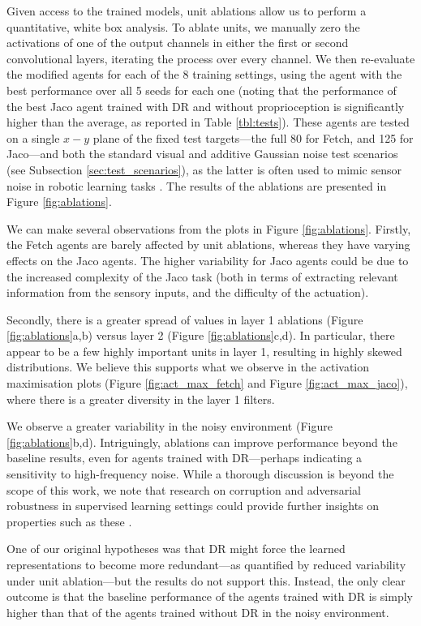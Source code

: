 Given access to the trained models, unit ablations allow us to perform a
quantitative, white box analysis. To ablate units, we manually zero the
activations of one of the output channels in either the first or second
convolutional layers, iterating the process over every channel. We then
re-evaluate the modified agents for each of the 8 training settings,
using the agent with the best performance over all 5 seeds for each one
(noting that the performance of the best Jaco agent trained with DR and
without proprioception is significantly higher than the average, as
reported in Table \ref{tbl:tests}). These agents are tested on a single
\(x-y\) plane of the fixed test targets---the full 80 for Fetch, and 125
for Jaco---and both the standard visual and additive Gaussian noise test
scenarios (see Subsection \ref{sec:test_scenarios}), as the latter is
often used to mimic sensor noise in robotic learning tasks
\cite{jakobi1995noise}. The results of the ablations are presented in
Figure \ref{fig:ablations}.

We can make several observations from the plots in Figure
\ref{fig:ablations}. Firstly, the Fetch agents are barely affected by
unit ablations, whereas they have varying effects on the Jaco agents.
The higher variability for Jaco agents could be due to the increased
complexity of the Jaco task (both in terms of extracting relevant
information from the sensory inputs, and the difficulty of the
actuation).

Secondly, there is a greater spread of values in layer 1 ablations
(Figure \ref{fig:ablations}a,b) versus layer 2 (Figure
\ref{fig:ablations}c,d). In particular, there appear to be a few highly
important units in layer 1, resulting in highly skewed distributions. We
believe this supports what we observe in the activation maximisation
plots (Figure \ref{fig:act_max_fetch} and Figure
\ref{fig:act_max_jaco}), where there is a greater diversity in the layer
1 filters.

We observe a greater variability in the noisy environment (Figure
\ref{fig:ablations}b,d). Intriguingly, ablations can improve performance
beyond the baseline results, even for agents trained with DR---perhaps
indicating a sensitivity to high-frequency noise. While a thorough
discussion is beyond the scope of this work, we note that research on
corruption and adversarial robustness in supervised learning settings
could provide further insights on properties such as these
\cite{gilmer2019adversarial, hendrycks2019benchmarking}.

One of our original hypotheses was that DR might force the learned
representations to become more redundant---as quantified by reduced
variability under unit ablation---but the results do not support this.
Instead, the only clear outcome is that the baseline performance of the
agents trained with DR is simply higher than that of the agents trained
without DR in the noisy environment.

